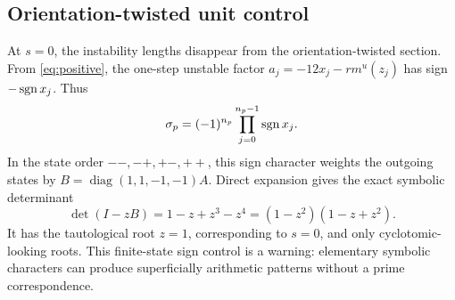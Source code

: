 \subsection{Orientation-twisted unit control}
\label{app:orientation-control}

At \(s=0\), the instability lengths disappear from the orientation-twisted
section.  From \eqref{eq:positive}, the one-step unstable factor
\(a_j=-12x_j-rm^u(z_j)\) has sign \(-\operatorname{sgn} x_j\).  Thus
\[
 \sigma_p=(-1)^{n_p}\prod_{j=0}^{n_p-1}\operatorname{sgn} x_j.
\]
In the state order \(--,-+,+-,++\), this sign character weights the outgoing
states by \(B=\operatorname{diag}(1,1,-1,-1)A\).  Direct expansion gives the
exact symbolic determinant
\[
 \det(I-zB)=1-z+z^3-z^4=(1-z^2)(1-z+z^2).
\]
It has the tautological root \(z=1\), corresponding to \(s=0\), and only
cyclotomic-looking roots.  This finite-state sign control is a warning:
elementary symbolic characters can produce superficially arithmetic patterns
without a prime correspondence.
